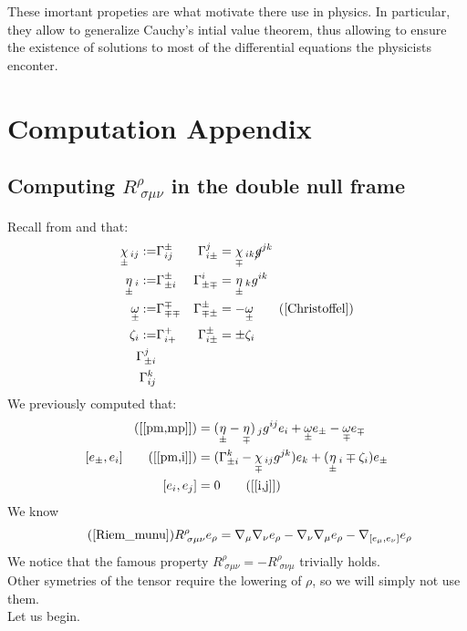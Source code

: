 \documentclass[a4paper,11pt]{article}
\numberwithin{equation}{section}
\theoremstyle{definition}
\begin{document}
These imortant propeties are what motivate there use in physics. In particular, they allow to generalize Cauchy's intial value theorem, thus allowing to ensure the existence of solutions to most of the differential equations the physicists enconter.

\newpage
\section{Computation Appendix}
\subsection{Computing $R^\rho_{\;\sigma\mu\nu}$ in the double null frame} \label{CompR}
Recall from \cite{Art} and \cite{Chris} that:
\begin{align*}
    \underset{\pm}{\chi}\,_{ij} :=&\Gamma_{ij}^\pm &\Gamma_{i\pm}^j&=\underset{\mp}{\chi}\,_{ik}\cancel{g}^{jk}\\
    \underset{\pm}{\eta}\,_i :=&\Gamma_{\pm i}^\pm &\Gamma_{\pm\mp}^i&=\underset{\pm}{\eta}\,_kg^{ik}\\
    \underset{\pm}{\omega}:=&\Gamma_{\mp\mp}^\mp &\Gamma_{\mp\pm}^\pm&=-\underset{\pm}{\omega}\tag{\ref{Christoffel}}\\
    \zeta_i :=& \Gamma_{i+}^+ &\Gamma_{i\pm}^\pm&=\pm\zeta_i \\
    \Gamma_{\pm i}^j&\\
    \Gamma_{ij}^k&
\end{align*}
We previously computed that:
\begin{align}
    [e_\pm,e_\mp]\tag{\ref{[pm,mp]}}
    &=(\underset{\pm}{\eta}-\underset{\mp}{\eta})\,_jg^{ij} e_i+ \underset{\pm}{\omega} e_\pm - \underset{\mp}{\omega} e_\mp\\
    [e_\pm,e_i]\tag{\ref{[pm,i]}}&=(\Gamma_{\pm i}^k - \underset{\mp}{\chi}\,_{ij}g^{jk}) e_k + (\underset{\pm}{\eta}\,_i \mp \zeta_i) e_\pm\\
[e_i,e_j]&=0\tag{\ref{[i,j]}}
\end{align}
We know 
\begin{equation}\tag{\ref{Riem_munu}}
    R^\rho_{\;\sigma\mu\nu} e_\rho = \nabla_\mu\nabla_\nu e_\rho-\nabla_\nu\nabla_\mu e_\rho-\nabla_{[e_\mu,e_\nu]}e_\rho
\end{equation}
We notice that the famous property $R^\rho_{\;\sigma\mu\nu}=-R^\rho_{\;\sigma\nu\mu}$ trivially holds.\\
Other symetries of the tensor require the lowering of $\rho$, so we will simply not use them.\\
Let us begin.
\end{document}
